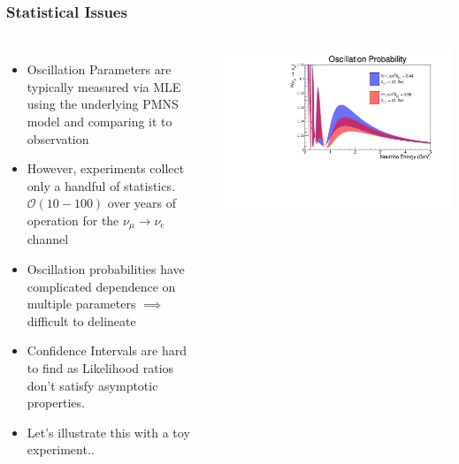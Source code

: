 \documentclass[9pt, aspectratio=169]{beamer}
\begin{document}
\begin{frame}
  \frametitle{Statistical Issues}
  \begin{columns}
  \begin{itemize}
    \item Oscillation Parameters are typically measured via MLE using the underlying PMNS model and comparing it to observation
    \item However, experiments collect only a handful of statistics. $\mathcal{O}(10-100)$ over years of operation for the $\nu_{\mu} \rightarrow \nu_{e}$ channel
    \item Oscillation probabilities have complicated dependence on multiple parameters $\implies$ difficult to delineate
    \item Confidence Intervals are hard to find as Likelihood ratios don't satisfy asymptotic properties.
    \item Let's illustrate this with a toy experiment..
  \end{itemize}
    \includegraphics[scale=0.35]{figures_final/osc_shaded.pdf}
  \end{columns}
\end{frame}
\end{document}

